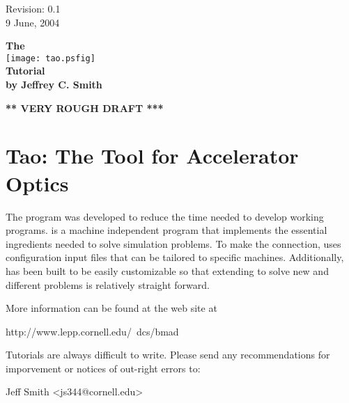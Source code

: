 \documentclass{report}
\begin{document}

\thispagestyle{empty}

\begin{flushright}
\large
  Revision: 0.1 \\
  9 June, 2004 \\
\end{flushright}

\vfill

{
\begin{center}
{\Huge \sf\bf The} \\
\vskip 0.1in
\texttt{[image: tao.psfig]} \\
\vskip 0.1in
{\Huge \sf\bf Tutorial} \\
\vskip 0.1in
{\normalsize \sf\bf by Jeffrey C. Smith} \\
\end{center}
}

\vskip 1in
\begin{center}
{\Huge \bf *** VERY ROUGH DRAFT ***}
\end{center}
\vfill
\break

{
\setlength{\parskip}{\dPar}
\setlength{\parindent}{0ex}

\section*{Tao: The Tool for Accelerator Optics}

The \tao program was developed
to reduce the time needed to develop working programs. \tao is a
machine independent program that implements the essential ingredients
needed to solve simulation problems. To make the
connection, \tao uses configuration input files that can be tailored to
specific machines. Additionally, \tao has been built
to be easily customizable so that extending \tao to solve new and
different problems is relatively straight forward.

More information can be found at the \bmad web site at
\begin{example}
  http://www.lepp.cornell.edu/~dcs/bmad
\end{example}

Tutorials are always difficult to write. Please send any recommendations 
for imporvement or notices of out-right errors to:
\begin{example}
  Jeff Smith <js344@cornell.edu>
\end{example}
}
\end{document}
